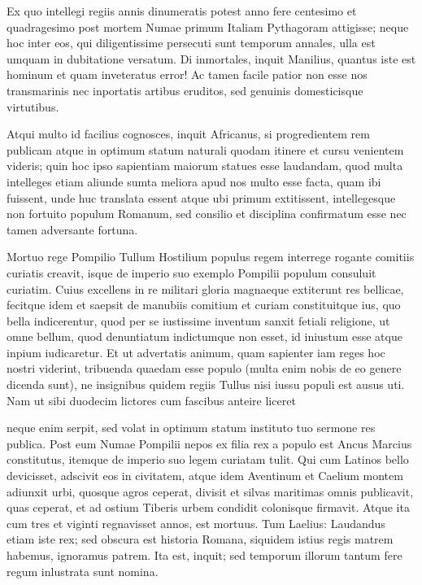  Ex quo intellegi regiis annis dinumeratis potest anno fere centesimo et quadragesimo post mortem Numae primum Italiam Pythagoram attigisse; neque hoc inter eos, qui diligentissime persecuti sunt temporum annales, ulla est umquam in dubitatione versatum. Di inmortales, inquit Manilius, quantus iste est hominum et quam inveteratus error! Ac tamen facile patior non esse nos transmarinis nec inportatis artibus eruditos, sed genuinis domesticisque virtutibus.

 Atqui multo id facilius cognosces, inquit Africanus, si progredientem rem publicam atque in optimum statum naturali quodam itinere et cursu venientem videris; quin hoc ipso sapientiam maiorum statues esse laudandam, quod multa intelleges etiam aliunde sumta meliora apud nos multo esse facta, quam ibi fuissent, unde huc translata essent atque ubi primum extitissent, intellegesque non fortuito populum Romanum, sed consilio et disciplina confirmatum esse nec tamen adversante fortuna.

 Mortuo rege Pompilio Tullum Hostilium populus regem interrege rogante comitiis curiatis creavit, isque de imperio suo exemplo Pompilii populum consuluit curiatim. Cuius excellens in re militari gloria magnaeque extiterunt res bellicae, fecitque idem et saepsit de manubiis comitium et curiam constituitque ius, quo bella indicerentur, quod per se iustissime inventum sanxit fetiali religione, ut omne bellum, quod denuntiatum indictumque non esset, id iniustum esse atque inpium iudicaretur. Et ut advertatis animum, quam sapienter iam reges hoc nostri viderint, tribuenda quaedam esse populo (multa enim nobis de eo genere dicenda sunt), ne insignibus quidem regiis Tullus nisi iussu populi est ausus uti. Nam ut sibi duodecim lictores cum fascibus anteire liceret

 neque enim serpit, sed volat in optimum statum instituto tuo sermone res publica. Post eum Numae Pompilii nepos ex filia rex a populo est Ancus Marcius constitutus, itemque de imperio suo legem curiatam tulit. Qui cum Latinos bello devicisset, adscivit eos in civitatem, atque idem Aventinum et Caelium montem adiunxit urbi, quosque agros ceperat, divisit et silvas maritimas omnis publicavit, quas ceperat, et ad ostium Tiberis urbem condidit colonisque firmavit. Atque ita cum tres et viginti regnavisset annos, est mortuus. Tum Laelius: Laudandus etiam iste rex; sed obscura est historia Romana, siquidem istius regis matrem habemus, ignoramus patrem. Ita est, inquit; sed temporum illorum tantum fere regum inlustrata sunt nomina.

